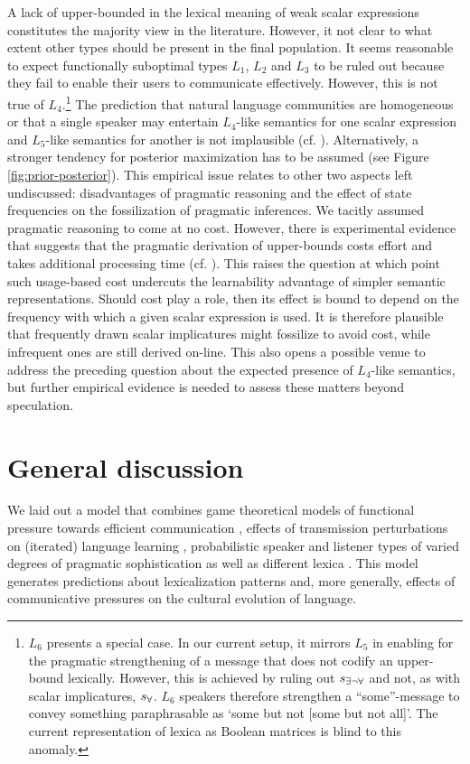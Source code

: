 \documentclass[a4paper]{article}
\newcommand{\state}{\ensuremath{s}\xspace}		%
\newcommand{\mystate}[1]{\ensuremath{\state_{\text{#1}}}\xspace} %
\newcommand{\ssome}{\mystate{\ensuremath{\exists\neg\forall}}}
\newcommand{\sall}{\mystate{\ensuremath{\forall}}}
\begin{document}
A lack of upper-bounded in the lexical meaning of weak scalar expressions constitutes the majority view in the literature. However, it not clear to what extent other types should be present in the final population. It seems reasonable to expect functionally suboptimal types $L_1$, $L_2$ and $L_3$ to be ruled out because they fail to enable their users to communicate effectively. However, this is not true of $L_4$.\footnote{$L_6$ presents a special case. In our current setup, it mirrors $L_5$ in enabling for the pragmatic strengthening of a message that does not codify an upper-bound lexically. However, this is achieved by ruling out $\ssome$ and not, as with scalar implicatures, $\sall$. $L_6$ speakers therefore strengthen a ``some''-message to convey something paraphrasable as `some but not [some but not all]'. The current representation of lexica as Boolean matrices is blind to this anomaly.} The prediction that natural language communities are homogeneous or that a single speaker may entertain $L_4$-like semantics for one scalar expression and $L_5$-like semantics for another is not implausible (cf. \citealt{franke+degen:2016}). Alternatively, a stronger tendency for posterior maximization has to be assumed (see Figure \ref{fig:prior-posterior}). This empirical issue relates to other two aspects left undiscussed: disadvantages of pragmatic reasoning and the effect of state frequencies on the fossilization of pragmatic inferences. We tacitly assumed pragmatic reasoning to come at no cost. However, there is experimental evidence that suggests  that the pragmatic derivation of upper-bounds costs effort and takes additional processing time (cf. \citealt{deNeys+schaeken:2007, huang+snedeker:2009}). This raises the question at which point such usage-based cost undercuts the learnability advantage of simpler semantic representations. Should cost play a role, then its effect is bound to depend on the frequency with which a given scalar expression is used. It is therefore plausible that frequently drawn scalar implicatures might fossilize to avoid cost, while infrequent ones are still derived on-line. This also opens a possible venue to address the preceding question about the expected presence of $L_4$-like semantics, but further empirical evidence is needed to assess these matters beyond speculation. 


\section{General discussion}\label{sec:discussion}
We laid out a model that combines game theoretical models of functional pressure towards efficient communication \citep{nowak+krakauer:1999}, effects of transmission perturbations on (iterated) language learning \citep{griffiths+kalish:2007}, probabilistic speaker and listener types of varied degrees of pragmatic sophistication \citep{frank+goodman:2012, franke+jaeger:2014} as well as different lexica \citep{bergen+etal:2012,bergen+etal:2016}. This model generates predictions about lexicalization patterns and, more generally, effects of communicative pressures on the cultural evolution of language. 
\end{document}
